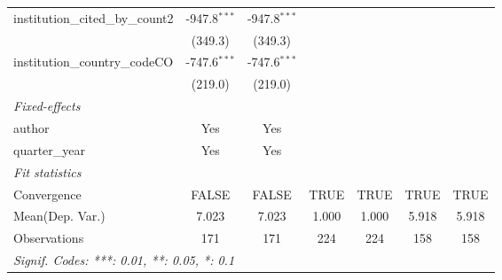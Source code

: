 \begin{tabular}{lcccccc}
   institution\_cited\_by\_count2    & -947.8$^{***}$ & -947.8$^{***}$ &      &      &      &   \\   
                                     & (349.3)        & (349.3)        &      &      &      &   \\   
   institution\_country\_codeCO      & -747.6$^{***}$ & -747.6$^{***}$ &      &      &      &   \\   
                                     & (219.0)        & (219.0)        &      &      &      &   \\   
   \midrule
   \emph{Fixed-effects}\\
   author                            & Yes            & Yes            &      &      &      & \\  
   quarter\_year                     & Yes            & Yes            &      &      &      & \\  
   \midrule
   \emph{Fit statistics}\\
   Convergence                       &FALSE           & FALSE          & TRUE & TRUE & TRUE & TRUE\\  
Mean(Dep. Var.) & 7.023 & 7.023 & 1.000 & 1.000 & 5.918 & 5.918 \\
   Observations                      & 171            & 171            & 224  & 224  & 158  & 158\\  
   \midrule \midrule
   \multicolumn{7}{l}{\emph{Signif. Codes: ***: 0.01, **: 0.05, *: 0.1}}\\
\end{tabular}
\par\endgroup

